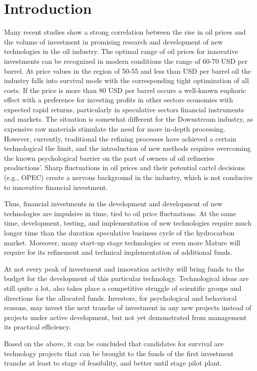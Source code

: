\documentclass[12pt]{report}
\theoremstyle{definition}
\begin{document}
\section{Introduction}
Many recent studies show a strong correlation between the rise in oil prices and the volume of investment in promising research and development of new technologies in the oil industry.
The optimal range of oil prices for innovative investments can be recognized in modern conditions the range of 60-70 USD per barrel.
At price values in the region of 50-55 and less than USD per barrel oil the industry falls into survival mode with the corresponding tight optimization of all costs.
If the price is more than 80 USD per barrel occurs a well-known euphoric effect with a preference for investing profits in other sectors
economies with expected rapid returns, particularly in speculative sectors financial instruments and markets.
The situation is somewhat different for the Downstream industry, as expensive raw materials stimulate the need for more in-depth processing. However, currently, traditional the refining processes have achieved a certain technological the limit, and the introduction of new methods requires overcoming the known psychological barrier on the part of owners of oil refineries productions'. 
Sharp fluctuations in oil prices and their potential cartel decisions (e.g., OPEC) create a nervous background in the industry,
which is not conducive to innovative financial investment.

Thus, financial investments in the development and development of new technologies are impulsive in time, tied to oil price fluctuations.
At the same time, development, testing, and implementation of new technologies require much longer time than the duration speculative business cycle of the hydrocarbon market. 
Moreover, many start-up stage technologies or even more Mature will require for its refinement and technical implementation of additional funds. 

At not every peak of investment and innovation activity will bring funds to the budget for the development of this particular technology.
Technological ideas are still quite a lot, also takes place a competitive struggle of scientific groups and directions for the allocated funds.
Investors, for psychological and behavioral reasons, may invest the next tranche of investment in any new projects instead of projects under active development, but not yet demonstrated from management its practical efficiency. 

Based on the above, it can be concluded that candidates for survival are technology projects that can be brought to the funds of the first investment tranche at least to stage of feasibility, and better until stage pilot plant.
\end{document}
